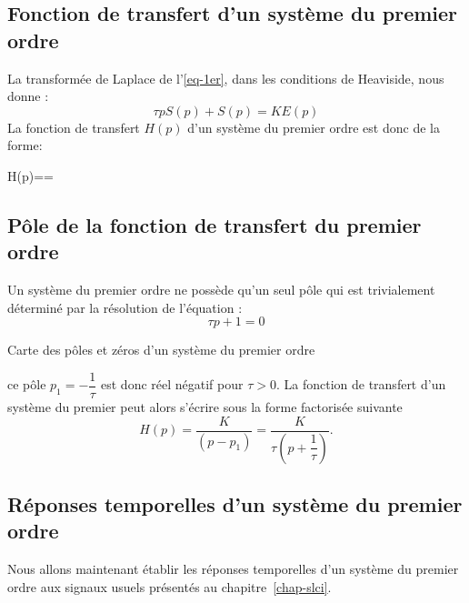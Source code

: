 \subsection{Fonction de transfert d'un système du premier ordre}
La transformée de Laplace de l'\cref{eq-1er}, dans les conditions de 
Heaviside, nous donne :
\[
\tau pS(p)+S(p)=KE(p)
\]
La fonction de transfert $H(p)$ d'un système du premier ordre est 
donc de la forme:
\begin{bequation}
    H(p)==\label{eq-ft1er}
\end{bequation}
\subsection{Pôle de la fonction de transfert du premier ordre}
Un système du premier ordre ne possède qu'un seul pôle qui est trivialement 
déterminé par la résolution de l'équation :
\[
\tau p + 1 =0
\]
\begin{marginfigure}
    \centering
    \caption*{Carte des pôles et zéros d'un système du premier ordre}
\end{marginfigure}
ce pôle $p_1=-\dfrac{1}{\tau}$ est donc réel négatif pour $\tau>0$.
La fonction de transfert d'un système du premier peut alors s'écrire 
sous la forme factorisée suivante
\[
H(p)=\dfrac{K}{(p-p_1)}=\dfrac{K}{\tau\left(p+\dfrac{1}{\tau}\right)}.
\]
\subsection{Réponses temporelles d'un système du premier ordre}
Nous allons maintenant établir les réponses temporelles d'un système 
du premier ordre aux signaux usuels présentés au chapitre~\cref{chap-slci}.
